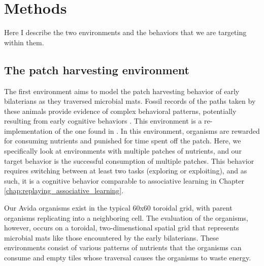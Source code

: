 \section{Methods}

Here I describe the two environments and the behaviors that we are targeting within them. 

\subsection{The patch harvesting environment}

The first environment aims to model the patch harvesting behavior of early bilaterians as they traversed microbial mats. 
Fossil records of the paths taken by these animals provide evidence of complex behavioral patterns, potentially resulting from early cognitive behaviors \citep{carboneWhenLifeGot2014}. 
This environment is a re-implementation of the one found in \citep{pontesEvolutionaryOriginsCognition2021}. 
In this environment, organisms are rewarded for consuming nutrients and punished for time spent off the patch. 
Here, we specifically look at environments with multiple patches of nutrients, and our target behavior is the successful consumption of multiple patches. 
This behavior requires switching between at least two tasks (exploring or exploiting), and as such, it is a cognitive behavior comparable to associative learning in Chapter \ref{chap:replaying_associative_learning}.

Our Avida organisms exist in the typical 60x60 toroidal grid, with parent organisms replicating into a neighboring cell. 
The evaluation of the organisms, however, occurs on a toroidal, two-dimenstional spatial grid that represents microbial mats like those encountered by the early bilaterians. 
These environments consist of various patterns of nutrients that the organisms can consume and empty tiles whose traversal causes the organisms to waste energy. 

